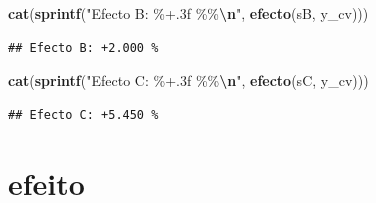 \documentclass[
]{article}
\newenvironment{Shaded}{\begin{snugshade}}{\end{snugshade}}
\newcommand{\FunctionTok}[1]{\textcolor[rgb]{0.13,0.29,0.53}{\textbf{#1}}}
\newcommand{\NormalTok}[1]{#1}
\newcommand{\SpecialCharTok}[1]{\textcolor[rgb]{0.81,0.36,0.00}{\textbf{#1}}}
\newcommand{\StringTok}[1]{\textcolor[rgb]{0.31,0.60,0.02}{#1}}
\begin{document}
\begin{Shaded}
\begin{Highlighting}[]
\FunctionTok{cat}\NormalTok{(}\FunctionTok{sprintf}\NormalTok{(}\StringTok{"Efecto B: \%+.3f \%\%}\SpecialCharTok{\textbackslash{}n}\StringTok{"}\NormalTok{, }\FunctionTok{efecto}\NormalTok{(sB, y\_cv)))}
\end{Highlighting}
\end{Shaded}

\begin{verbatim}
## Efecto B: +2.000 %
\end{verbatim}

\begin{Shaded}
\begin{Highlighting}[]
\FunctionTok{cat}\NormalTok{(}\FunctionTok{sprintf}\NormalTok{(}\StringTok{"Efecto C: \%+.3f \%\%}\SpecialCharTok{\textbackslash{}n}\StringTok{"}\NormalTok{, }\FunctionTok{efecto}\NormalTok{(sC, y\_cv)))}
\end{Highlighting}
\end{Shaded}

\begin{verbatim}
## Efecto C: +5.450 %
\end{verbatim}

\section{efeito}\label{efeito}
\end{document}
